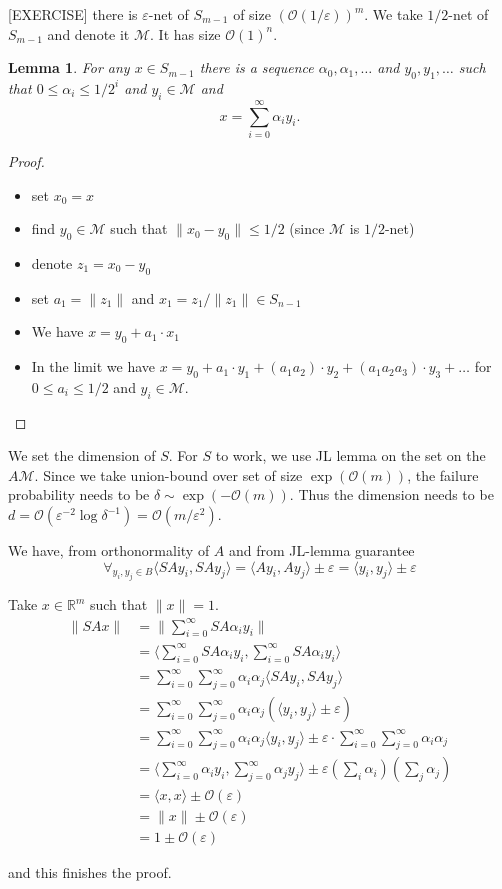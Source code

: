 \documentclass[11pt]{article}
\newtheorem{lemma}[theorem]{Lemma}
\newcommand{\bigo}{\mathcal{O}}
\begin{document}
[EXERCISE] there is $\varepsilon$-net of $S_{m-1}$ of size $(\bigo(1/\varepsilon))^m$. We take $1/2$-net of $S_{m-1}$ and denote it $\mathcal{M}$. It has size $\bigo(1)^n$.

\begin{lemma}
For any $x \in S_{m-1}$ there is a sequence $\alpha_0,\alpha_1,\ldots$ and $y_0,y_1,\ldots$ such that $0 \le \alpha_i \le 1/2^i$ and $y_i \in \mathcal{M}$ and 
$$x = \sum_{i=0}^{\infty} \alpha_i y_i.$$
\end{lemma}
\begin{proof}
\ 
\begin{itemize}
\item set $x_0 = x$ 
\item find $y_0 \in \mathcal{M}$ such that $\| x_0- y_0 \| \le 1/2$ (since $\mathcal{M}$ is $1/2$-net)
\item denote $z_1 = x_0 - y_0$
\item set $a_1 = \|z_1\|$ and $x_1 = z_1/\|z_1\| \in S_{n-1}$
\item We have $x =  y_0 + a_1 \cdot x_1$ 
\item In the limit we have $x = y_0 + a_1 \cdot y_1 + (a_1 a_2) \cdot y_2 + (a_1 a_2 a_3) \cdot y_3 + \ldots$
for $0 \le a_i \le 1/2$ and $y_i \in \mathcal{M}$.
\end{itemize}
\end{proof}

We set the dimension of $S$. For $S$ to work, we use JL lemma on the set on the $A \mathcal{M}$. Since we take union-bound over set of size $\exp(\bigo(m))$, the failure probability needs to be $\delta \sim \exp(-\bigo(m))$. Thus the dimension needs to be $d = \bigo(\varepsilon^{-2} \log \delta^{-1}) = \bigo(m/\varepsilon^2)$.

We have, from orthonormality of $A$ and from JL-lemma guarantee
$$\forall_{y_i,y_j \in B} \langle SAy_i, SAy_j \rangle = \langle Ay_i, Ay_j \rangle  \pm \varepsilon = \langle y_i, y_j \rangle \pm \varepsilon$$

Take $x \in \mathbb{R}^m$ such that $\|x\| = 1$.
\begin{align*}
\|SAx\| &= \| \sum_{i=0}^{\infty} SA \alpha_i y_i \|\\
&= \langle \sum_{i=0}^{\infty} SA \alpha_i y_i , \sum_{i=0}^{\infty} SA \alpha_i y_i  \rangle\\
&= \sum_{i=0}^{\infty} \sum_{j=0}^{\infty} \alpha_i \alpha_j \langle SAy_i, SAy_j \rangle\\
&= \sum_{i=0}^{\infty} \sum_{j=0}^{\infty} \alpha_i \alpha_j ( \langle y_i, y_j \rangle \pm \varepsilon)\\
&= \sum_{i=0}^{\infty} \sum_{j=0}^{\infty} \alpha_i \alpha_j \langle y_i, y_j \rangle \pm \varepsilon \cdot \sum_{i=0}^{\infty} \sum_{j=0}^{\infty} \alpha_i \alpha_j\\
&= \langle \sum_{i=0}^{\infty} \alpha_i y_i, \sum_{j=0}^{\infty} \alpha_j y_j \rangle \pm \varepsilon \left( \sum_i \alpha_i \right) \left( \sum_j \alpha_j \right)\\
&= \langle x, x\rangle \pm \bigo(\varepsilon)\\
&= \|x\| \pm \bigo(\varepsilon)\\
&= 1 \pm \bigo(\varepsilon)
\end{align*}

and this finishes the proof.
\end{document}

